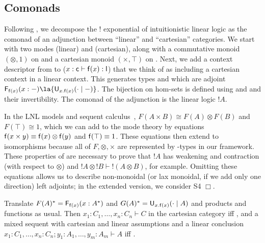 \subsection{Comonads}  
\label{sec:example:bang}

Following \citet{benton94mixed,bentonwadler96adjoint}, we decompose the
$!$ exponential of intuitionistic linear logic as the comonad of an
adjunction between ``linear'' and ``cartesian'' categories.  We start
with two modes  (linear) and  (cartesian), along with a
commutative monoid $(\otimes,1)$ on  and a cartesian monoid
$(\times,\top)$ on .  Next, we add a context descriptor from
 to  ($x : \mathsf{c} \vdash \mathsf{f}(x) : \mathsf{l}$) that we
think of as including a cartesian context in a linear context.  This
generates types  and
 which are
adjoint $\F{\dsd{f}(x)}{x:-} \la {\U{x.\dsd{f}(x)}{\cdot}{-}}$.  The
bijection on hom-sets is defined using \FL\/ and \FR\/ and their
invertibility.  The comonad of the adjunction
 is the linear logic $!A$.

In the LNL models and sequent calculus~\citep{benton94mixed}, $F(A
\times B) \cong F(A) \otimes F(B)$ and $F(\top) \cong 1$, which we can
add to the mode theory by equations $\mathsf{f}(x \times y) \equiv \mathsf{f}(x)
\otimes \mathsf{f}(y)$ and $\mathsf{f}(\top) \equiv 1$. These equations then
extend to isomorphisms because all of $F,\otimes,\times$ are represented
by \Fsymb-types in our framework.  These properties of  are
necessary to prove that $!  A$ has weakening and contraction (with
respect to $\otimes$) and $!A \otimes !B \vdash !(A \otimes B)$, for
example.  Omitting these equations allows us to describe non-monoidal
(or lax monoidal, if we add only one direction) left adjoints;
in the extended version, we consider S4 $\Box$.  

\begin{theorem}
Translate $F(A)^* = \mathsf{F}_{\mathsf{f}(x)}(x:A^*)$ and $G(A)^* =
\mathsf{U}_{x.\mathsf{f}(x)}(\cdot \mid A)$ and products and functions as usual.  Then
$x_1:C_1,\ldots,x_n:C_n \vdash C$ in the cartesian category iff
, and
a mixed sequent with cartesian and linear assumptions and a linear
conclusion $x_1:C_1,\ldots,x_n:C_n;y_1:A_1,\ldots,y_m:A_m \vdash A$ iff
.
\end{theorem}

